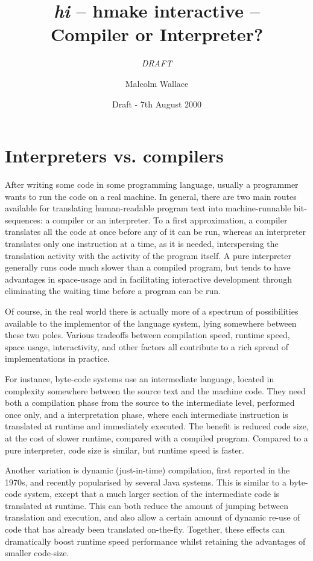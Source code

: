 \documentclass[a4paper]{llncs}
\title{{\em hi} -- hmake interactive -- \\Compiler or Interpreter?}
\subtitle{{\em DRAFT}}
\author{Malcolm Wallace}
\institute{University of York, UK}
\date{Draft - 7th August 2000}
\begin{document}
\maketitle


\section{Interpreters vs. compilers}


After writing some code in some programming language, usually a
programmer wants to run the code on a real machine.  In general, there
are two main routes available for translating human-readable program
text into machine-runnable bit-sequences: a compiler or an interpreter.
To a first approximation, a compiler translates all the code at
once before any of it can be run, whereas an interpreter translates
only one instruction at a time, as it is needed, interspersing the
translation activity with the activity of the program itself.  A pure
interpreter generally runs code much slower than a compiled program,
but tends to have advantages in space-usage and in facilitating
interactive development through eliminating the waiting time before
a program can be run.

Of course, in the real world there is actually more of a spectrum of
possibilities available to the implementor of the language system,
lying somewhere between these two poles.  Various tradeoffs between
compilation speed, runtime speed, space usage, interactivity, and other
factors all contribute to a rich spread of implementations in practice.

For instance, byte-code systems use an intermediate language, located
in complexity somewhere between the source text and the machine code.
They need both a compilation phase from the source to the intermediate
level, performed once only, and a interpretation phase, where each
intermediate instruction is translated at runtime and immediately
executed.  The benefit is reduced code size, at the cost of slower
runtime, compared with a compiled program.  Compared to a pure
interpreter, code size is similar, but runtime speed is faster.

Another variation is dynamic (just-in-time) compilation, first reported
in the 1970s, and recently popularised by several Java systems.
This is similar to a byte-code system, except that a much larger
section of the intermediate code is translated at runtime.  This can
both reduce the amount of jumping between translation and execution,
and also allow a certain amount of dynamic re-use of code that has
already been translated on-the-fly.  Together, these effects can
dramatically boost runtime speed performance whilst retaining the
advantages of smaller code-size.
\end{document}
